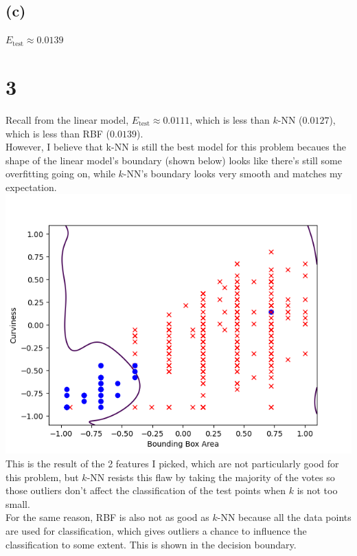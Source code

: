 \documentclass{article}
\begin{document}
	\subsection*{(c)}
		$E_\text{test} \approx 0.0139$
		
	\section*{3}
		Recall from the linear model, $E_\text{test} \approx 0.0111$, which is less than $k$-NN ($0.0127$), which is less than RBF ($0.0139$).\\
		However, I believe that k-NN is still the best model for this problem becaues the shape of the linear model's boundary (shown below) looks like there's still some overfitting going on, while $k$-NN's boundary looks very smooth and matches my expectation.\\
		\includegraphics[scale=0.8]{../hw09/3.png}\\
		This is the result of the 2 features I picked, which are not particularly good for this problem, but $k$-NN resists this flaw by taking the majority of the votes so those outliers don't affect the classification of the test points when $k$ is not too small.\\
		For the same reason, RBF is also not as good as $k$-NN because all the data points are used for classification, which gives outliers a chance to influence the classification to some extent. This is shown in the decision boundary.
		
\end{document}

